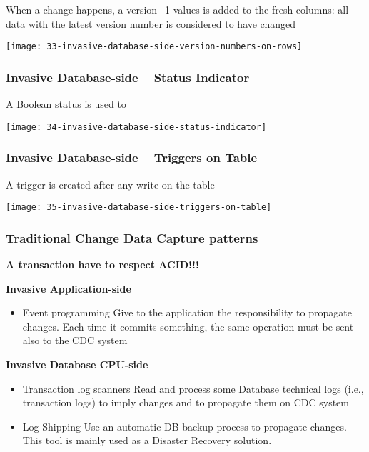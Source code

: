 When a change happens, a version+1 values is added to the fresh columns: all data with the latest version number is considered to have changed

\begin{center}
\texttt{[image: 33-invasive-database-side-version-numbers-on-rows]}
\end{center}

\subsubsection{Invasive Database-side – Status Indicator}

A Boolean status is used to 

\begin{center}
\texttt{[image: 34-invasive-database-side-status-indicator]}
\end{center}

\subsubsection{Invasive Database-side – Triggers on Table}

A trigger is created after any write on the table

\begin{center}
\texttt{[image: 35-invasive-database-side-triggers-on-table]}
\end{center}

\subsubsection{Traditional Change Data Capture patterns}

\textbf{A transaction have to respect ACID!!!}

\textbf{Invasive Application-side}

\begin{itemize}
	\item Event programming
	Give to the application the responsibility to propagate changes. Each time it commits something, the same operation must be sent also to the CDC system
\end{itemize}

\textbf{Invasive Database CPU-side}

\begin{itemize}
	\item Transaction log scanners
	Read and process some Database technical logs (i.e., transaction logs) to imply changes and to propagate them on CDC system
	\item Log Shipping
	Use an automatic DB backup process to propagate changes. This tool is mainly used as a Disaster Recovery solution.
\end{itemize}

